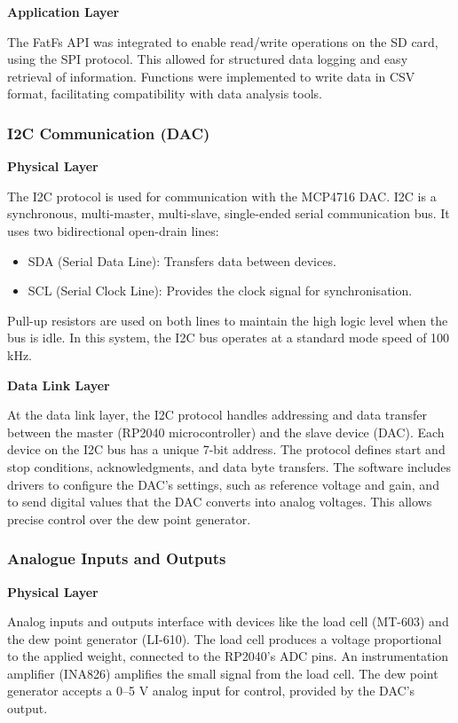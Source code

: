 \textbf{Application Layer}

The FatFs API was integrated to enable read/write operations on the SD card, 
using the SPI protocol. This allowed for structured data logging and easy retrieval of information. 
Functions were implemented to write data in CSV format, facilitating compatibility with data analysis tools.

\subsubsection{I2C Communication (DAC)}

\textbf{Physical Layer}

The I2C protocol is used for communication with the MCP4716 DAC. I2C is a synchronous, multi-master, 
multi-slave, single-ended serial communication bus. It uses two bidirectional open-drain lines:
\begin{itemize}
    \item SDA (Serial Data Line): Transfers data between devices.
    \item SCL (Serial Clock Line): Provides the clock signal for synchronisation.
\end{itemize}
Pull-up resistors are used on both lines to maintain the high logic level when the bus is idle. 
In this system, the I2C bus operates at a standard mode speed of 100 kHz.

\textbf{Data Link Layer}

At the data link layer, the I2C protocol handles addressing and data transfer between the master 
(RP2040 microcontroller) and the slave device (DAC). Each device on the I2C bus has a unique 7-bit address. 
The protocol defines start and stop conditions, acknowledgments, and data byte transfers. The software includes drivers to configure the DAC's settings, such as reference voltage and gain, and to send digital values that the DAC converts into analog voltages. This allows precise control over the dew point generator.

\subsubsection{Analogue Inputs and Outputs}

\textbf{Physical Layer}

Analog inputs and outputs interface with devices like the load cell (MT-603) and the dew point generator (LI-610). The load cell produces a voltage proportional to the applied weight, connected to the RP2040's ADC pins. An instrumentation amplifier (INA826) amplifies the small signal from the load cell. The dew point generator accepts a 0–5 V analog input for control, provided by the DAC's output.

